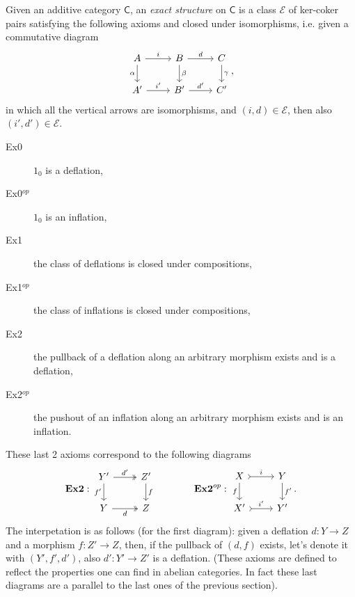 \begin{defn}
	Given an additive category $\mathsf{C}$, an {\em exact structure} on $\mathsf{C}$
	is a class $\mathcal{E}$ of ker-coker pairs satisfying the following axioms and closed under isomorphisms, i.e.
	given a commutative diagram
	\begin{equation}
	\begin{tikzcd}
		A \arrow[r, "i", rightarrow] \arrow[d, "\alpha"', rightarrow] &
		B \arrow[r, "d", rightarrow] \arrow[d, "\beta", rightarrow] &
		C \arrow[d, "\gamma", rightarrow] \\
		A' \arrow[r, "i'", rightarrow] &
		B' \arrow[r, "d'", rightarrow] &
		C'
	\end{tikzcd}
	,\end{equation} 
	in which all the vertical arrows are isomorphisms, and $\left(i, d\right) \in \mathcal{E}$, then also $\left(i', d'\right) \in \mathcal{E}$.
	\begin{description}
		\item[Ex0] $1_0$ is a deflation,
		\item[Ex0$^{op}$] $1_0$ is an inflation,
		\item[Ex1] the class of deflations is closed under compositions,
		\item[Ex1$^{op}$] the class of inflations is closed under compositions,
		\item[Ex2] the pullback of a deflation along an arbitrary morphism exists and is a deflation,
		\item[Ex2$^{op}$] the pushout of an inflation along an arbitrary morphism exists and is an inflation.
	\end{description} 
	These last 2 axioms correspond to the following diagrams
	\begin{equation}
	\mathbf{Ex2}:
	\begin{tikzcd}
		Y' \arrow[r, "d'", twoheadrightarrow] \arrow[d, "f'"', rightarrow] &
		Z' \arrow[d, "f", rightarrow] \\
		Y \arrow[r, "d"', twoheadrightarrow] &
		Z
	\end{tikzcd}\quad\quad\quad\quad
	\mathbf{Ex2}^{op}:
	\begin{tikzcd}
		X \arrow[r, "i", tail] \arrow[d, "f"', rightarrow] &
		Y \arrow[d, "f'", rightarrow] \\
		X' \arrow[r, "i'", tail] &
		Y'
	\end{tikzcd}
	.\end{equation} 
	The interpetation is as follows (for the first diagram):
	given a deflation $d: Y \to Z$ and a morphism $f: Z' \to Z$, then,
	if the pullback of $\left(d, f\right)$ exists, let's denote it with $\left(Y', f', d'\right)$, also $d': Y' \to Z'$ is a deflation.
	(These axioms are defined to reflect the properties one can find
	in abelian categories.
	In fact these last diagrams are a parallel to the last ones of the previous section).
\end{defn}

